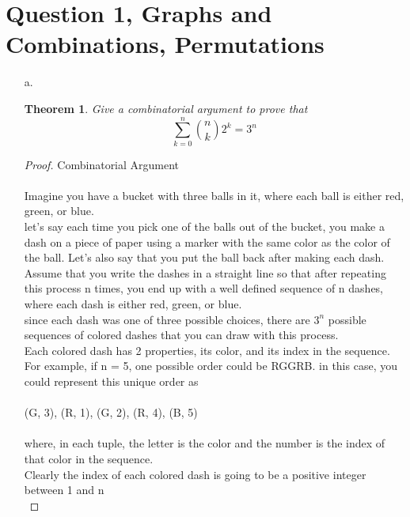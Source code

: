 \documentclass[11pt,fleqn]{article}
\newtheorem*{theorem}{Theorem}
\theoremstyle{definition}
\theoremstyle{remark}
\begin{document}
\section{Question 1, Graphs and Combinations, Permutations}
\begin{enumerate}
    \item[a.]
    \begin{theorem}
        \normalfont Give a combinatorial argument to prove that 
        \[
        \sum_{k=0}^{n} \binom{n}{k} 2^k = 3^n
        \]
    \end{theorem}
    \begin{proof} Combinatorial Argument\\\\
        Imagine you have a bucket with three balls in it, where each ball
        is either red, green, or blue.\\

        let's say each time you pick one of the balls out of the bucket,
        you make a dash on a piece of paper using
        a marker with the same color as the color of the ball.
        Let's also say that you put the ball back after making each dash. Assume that
        you write the dashes in a straight line so that after repeating this process
        n times, you end up with a well defined sequence of n dashes, where 
        each dash is either red, green, or blue.\\

        since each dash was one of three possible choices, there are 
        ${3}^{n}$ possible sequences of colored dashes 
        that you can draw with this process.\\

        Each colored dash has 2 properties, its color, and its index in
        the sequence.\\
        For example, if n = 5, one possible order could be RGGRB.
        in this case, you could represent this unique order as\\\\
        (G, 3), (R, 1), (G, 2), (R, 4), (B, 5)\\\\ 
        where, in each tuple, the letter is the color and
        the number is the index of that color in the sequence.\\

        Clearly the index of each colored dash is going to be a 
        positive integer between 1 and n\\


\end{proof}
\end{enumerate}
\end{document}
